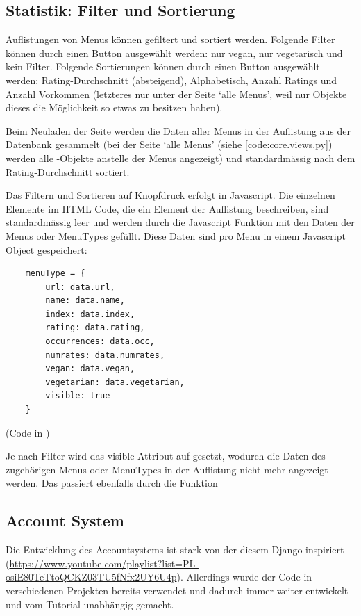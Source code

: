 \subsection{Statistik: Filter und Sortierung} \label{spez:Statistik}

Auflistungen von Menus können gefiltert und sortiert werden. Folgende Filter
können durch einen Button ausgewählt werden: nur vegan, nur vegetarisch und kein
Filter. Folgende Sortierungen können durch einen Button ausgewählt werden:
Rating-Durchschnitt (absteigend), Alphabetisch, Anzahl Ratings und Anzahl
Vorkommen (letzteres nur unter der Seite `alle Menus', weil nur 
Objekte dieses die Möglichkeit so etwas zu besitzen haben).

Beim Neuladen der Seite werden die Daten aller Menus in der Auflistung aus der
Datenbank gesammelt (bei der Seite `alle Menus' (siehe \ref{code:core.views.py})
werden alle -Objekte anstelle der Menus angezeigt) und
standardmässig nach dem Rating-Durchschnitt sortiert. 

Das Filtern und Sortieren auf Knopfdruck erfolgt in Javascript. Die einzelnen
 Elemente im HTML Code, die ein Element der Auflistung beschreiben,
sind standardmässig leer und werden durch die Javascript Funktion
 mit den Daten der Menus oder MenuTypes gefüllt. Diese Daten sind pro
Menu in einem Javascript Object gespeichert:

\begin{lstlisting}
    menuType = {
        url: data.url,
        name: data.name,
        index: data.index,
        rating: data.rating,
        occurrences: data.occ,
        numrates: data.numrates,
        vegan: data.vegan,
        vegetarian: data.vegetarian,
        visible: true
    }
\end{lstlisting}

(Code in )

Je nach Filter wird das visible Attribut auf  gesetzt, wodurch die
Daten des zugehörigen Menus oder MenuTypes in der Auflistung nicht mehr
angezeigt werden. Das passiert ebenfalls durch die  Funktion

\newpage

\subsection{Account System} \label{spez:Account}

Die Entwicklung des Accountsystems ist stark von der diesem Django inspiriert
(\url{https://www.youtube.com/playlist?list=PL-osiE80TeTtoQCKZ03TU5fNfx2UY6U4p}).
Allerdings wurde der Code in verschiedenen Projekten bereits verwendet und
dadurch immer weiter entwickelt und vom Tutorial unabhängig gemacht.

